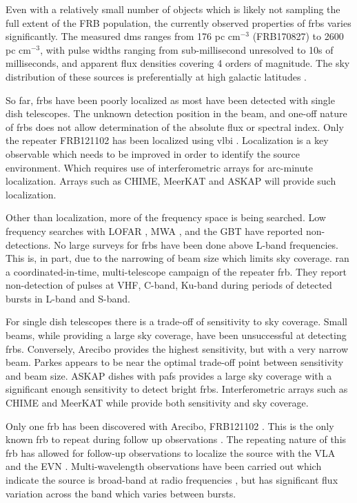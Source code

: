\documentclass[a4paper,fleqn,usenatbib]{mnras}
\begin{document}
Even with a relatively small number of objects which is likely not sampling the
full extent of the FRB population, the currently observed properties of
\glspl{frb} varies significantly.  The measured \glspl{dm} ranges from 176
pc cm$^{-3}$ (FRB170827) to 2600 pc cm$^{-3}$, with pulse widths ranging from
sub-millisecond unresolved to 10s of milliseconds, and apparent flux densities
covering 4 orders of magnitude. The sky distribution of these sources is
preferentially at high galactic latitudes \citep{2015MNRAS.451.3278M}.

So far, \glspl{frb} have been poorly localized as most have been detected with
single dish telescopes. The unknown detection position in the beam, and one-off
nature of \glspl{frb} does not allow determination of the absolute flux or
spectral index. Only the repeater FRB121102 has been localized using \gls{vlbi}
\citep{2017ApJ...834L...8M, 2017ApJ...834L...7T}. Localization is a key
observable which needs to be improved in order to identify the source
environment. Which requires use of interferometric arrays for arc-minute
localization. Arrays such as CHIME, MeerKAT and ASKAP will provide such
localization.

Other than localization, more of the frequency space is being searched. Low
frequency searches with LOFAR \citep{2015MNRAS.452.1254K}, MWA
\citep{2015AJ....150..199T}, and the GBT \citep{2017arXiv170107457C} have
reported non-detections.  No large surveys for \glspl{frb} have been done above
L-band frequencies. This is, in part, due to the narrowing of beam size which
limits sky coverage.  \cite{2017arXiv170507553L} ran a coordinated-in-time,
multi-telescope campaign of the repeater \gls{frb}.  They report non-detection
of pulses at VHF, C-band, Ku-band during periods of detected bursts in L-band
and S-band.

For single dish telescopes there is a trade-off of sensitivity to sky coverage.
Small beams, while providing a large sky coverage, have been unsuccessful at
detecting \glspl{frb}. Conversely, Arecibo provides the highest sensitivity, but
with a very narrow beam. Parkes appears to be near the optimal trade-off point
between sensitivity and beam size. ASKAP dishes with \glspl{paf} provides a
large sky coverage with a significant enough sensitivity to detect bright
\glspl{frb}. Interferometric arrays such as CHIME and MeerKAT while provide both
sensitivity and sky coverage.

Only one \gls{frb} has been discovered with Arecibo, FRB121102
\citep{2014ApJ...790..101S}. This is the only known \gls{frb} to repeat during
follow up observations \citep{2016Natur.531..202S}. The repeating nature of this
\gls{frb} has allowed for follow-up observations to localize the source with the
VLA \citep{2017Natur.541...58C} and the EVN \citep{2017ApJ...834L...8M}.
Multi-wavelength observations have been carried out which indicate the source is
broad-band at radio frequencies \citep{2017arXiv170507553L,atel10675}, but has
significant flux variation across the band which varies between bursts. 
\end{document}
